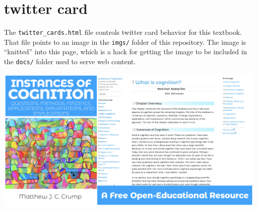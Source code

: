\documentclass[
  oneside,
  12pt]{crumpbook}
\begin{document}
\hypertarget{twitter-card}{%
\section{twitter card}\label{twitter-card}}

The \texttt{twitter\_cards.html} file controls twitter card behavior for this textbook. That file points to an image in the \texttt{imgs/} folder of this repository. The image is ``knitted'' into this page, which is a hack for getting the image to be included in the \texttt{docs/} folder used to serve web content.

\includegraphics[width=1\linewidth]{imgs/IOC_twittercard}
\end{document}
